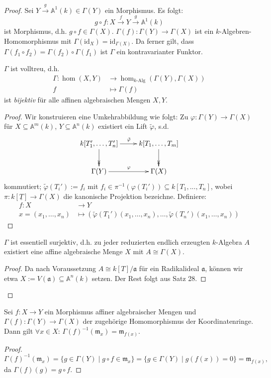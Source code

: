 \begin{proof}
  Sei $Y\xrightarrow{g}\mathbb{A}^{1}(k)\in\Gamma(Y)$ ein Morphismus. Es
  folgt:
  \[
    g\circ f:X\xrightarrow{f}Y\xrightarrow{g}\mathbb{A}^{1}(k)
  \] 
  ist Morphismus,  d.h. $g \circ f\in\Gamma(X)$. $\Gamma(f):\Gamma(Y)\rightarrow\Gamma(X)$
  ist ein $k$-Algebren-Homomorphismus mit $\Gamma(\text{id}_{X})=\text{id}_{\Gamma(X)}$. Da ferner gilt, dass $\Gamma(f_{1}\circ f_{2})=\Gamma(f_{2})\circ\Gamma(f_{1})$ ist $\Gamma$ ein kontravarianter Funktor.
  \begin{claim*}
    $\Gamma$ ist volltreu, d.h.
    \begin{align*}
      \Gamma:\hom(X,Y) & \rightarrow\hom_{k\text{-Alg}}(\Gamma(Y),\Gamma(X))\\
      f & \mapsto\Gamma(f)
    \end{align*}
    ist \emph{bijektiv} für alle affinen algebraischen Mengen $X,Y$.
  \end{claim*}
  \begin{proof}
    Wir konstruieren eine Umkehrabbildung wie folgt: Zu $\varphi:\Gamma(Y)\rightarrow\Gamma(X)$
    für $X\subseteq\mathbb{A}^{m}(k)$, $Y\subseteq\mathbb{A}^{n}(k)$ existiert ein Lift $\tilde\varphi$, s.d.
    \[
      \xymatrix{k[T_{1}',\ldots,T_{n}']\ar[r]^{\tilde{\varphi}}\ar@{->>}[d] & k[T_{1},\ldots,T_{m}]\ar@{->>}[d]\\
        \Gamma(Y)\ar[r]^{\varphi} & \Gamma(X)
      }
    \]
    kommutiert; $\tilde{\varphi}(T_{i}'):= f_i$ mit $f_i \in \pi^{-1}(\varphi(T_{i}')) \subseteq k[T_1,...,T_n]$, wobei $\pi : k[\underline{T}] \to \Gamma(X)$ die kanonische Projektion bezeichne. 
    Definiere:
    \begin{align*}
      f:X & \rightarrow Y\\
      x=(x_{1},\ldots,x_{n}) & \mapsto(\tilde{\varphi}(T_{1}')(x_{1},\ldots,x_{n}),\ldots,\tilde{\varphi}(T_{n}')(x_{1},\ldots,x_{n}))
    \end{align*}
  \end{proof}
  \begin{claim*}
    $\Gamma$ ist essentiell surjektiv, d.h. zu jeder reduzierten endlich
    erzeugten $k$-Algebra $A$ existiert eine affine algebraische Menge
    $X$ mit $A\cong\Gamma(X)$.
  \end{claim*}
  \begin{proof}
    Da nach Voraussetzung $A\cong k[T]/\mathfrak{a}$ für ein Radikalideal
    $\mathfrak{a}$, können wir etwa $X:=V(\mathfrak{a})\subseteq\mathbb{A}^{n}(k)$
    setzen. Der Rest folgt aus Satz 28.
  \end{proof}
\end{proof}
\begin{prop}
  \label{prop:funktiorialitaet-specm}
  Sei $f:X\rightarrow Y$ ein Morphismus affiner algebraischer Mengen und $\Gamma(f):\Gamma(Y)\rightarrow\Gamma(X)$
  der zugehörige Homomorphismus der Koordinatenringe. Dann gilt $\forall x\in X$:
  $\Gamma(f)^{-1}(\mathfrak{m}_{x})=\mathfrak{m}_{f(x)}$.
\end{prop}
\begin{proof}
  \[
    \Gamma(f)^{-1}(\mathfrak{m}_{x})=\{g\in\Gamma(Y)\mid g\circ f \in \mathfrak{m}_{x}\}=\{g\in\Gamma(Y)\mid g(f(x)) = 0 \} = \mathfrak{m}_{f(x)},
  \]
  da $\Gamma(f)(g) =g \circ f$.
\end{proof}
